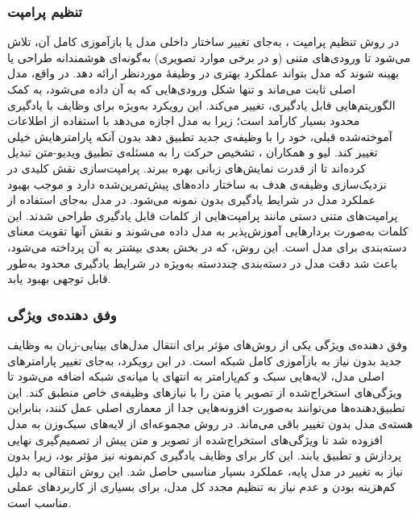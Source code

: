 \subsubsection{تنظیم پرامپت}
در روش تنظیم پرامپت
،
 به‌جای تغییر ساختار داخلی مدل یا بازآموزی کامل آن، تلاش می‌شود تا ورودی‌های متنی (و در برخی موارد تصویری) به‌گونه‌ای هوشمندانه طراحی یا بهینه شوند که مدل بتواند عملکرد بهتری در وظیفۀ موردنظر ارائه دهد. در واقع، مدل اصلی ثابت می‌ماند و تنها شکل ورودی‌هایی که به آن داده می‌شود، به کمک الگوریتم‌هایی قابل یادگیری، تغییر می‌کند. این رویکرد به‌ویژه برای وظایف با یادگیری محدود بسیار کارآمد است؛ زیرا به مدل اجازه می‌دهد با استفاده از اطلاعات آموخته‌شده قبلی، خود را با وظیفه‌ی جدید تطبیق دهد بدون آنکه پارامترهایش خیلی تغییر کند. لیو و همکاران 
\cite{actionclip}،
تشخیص حرکت را به مسئله‌ی تطبیق ویدیو-متن تبدیل کرده‌اند تا از قدرت نمایش‌های زبانی بهره ببرند. پرامپت‌سازی نقش کلیدی در نزدیک‌سازی وظیفه‌ی هدف به ساختار داده‌های پیش‌تمرین‌شده دارد و موجب بهبود عملکرد مدل در شرایط یادگیری بدون نمونه می‌شود. در مدل 
\cite{CoOp}
به‌جای استفاده از پرامپت‌های متنی دستی مانند
پرامپت‌هایی از کلمات قابل یادگیری طراحی شدند. این کلمات به‌صورت بردارهایی آموزش‌پذیر به مدل داده می‌شوند و نقش آنها تقویت معنای دسته‌بندی برای مدل است. این روش، که در بخش بعدی بیشتر به آن پرداخته می‌شود، باعث شد دقت مدل
در دسته‌بندی چند‌دسته به‌ویژه در شرایط یادگیری محدود به‌طور قابل توجهی بهبود یابد. 

\subsubsection{وفق دهنده‌ی ویژگی}
وفق دهنده‌ی ویژگی
یکی از روش‌های مؤثر برای انتقال مدل‌های بینایی-زبان به وظایف جدید بدون نیاز به بازآموزی کامل شبکه است. در این رویکرد، به‌جای تغییر پارامترهای اصلی مدل، لایه‌هایی سبک و کم‌پارامتر به انتهای یا میانه‌ی شبکه اضافه می‌شود تا ویژگی‌های استخراج‌شده از تصویر یا متن را با نیازهای وظیفه‌ی خاص منطبق کند. این تطبیق‌دهنده‌ها  می‌توانند به‌صورت افزونه‌هایی جدا از معماری اصلی عمل کنند، بنابراین هسته‌ی مدل بدون تغییر باقی می‌ماند. در روش 
\cite{CLIP-Adapter}
مجموعه‌ای از لایه‌های سبک‌وزن به مدل
افزوده شد تا ویژگی‌های استخراج‌شده از تصویر و متن پیش از تصمیم‌گیری نهایی پردازش و تطبیق یابند. این کار برای وظایف یادگیری کم‌نمونه نیز مؤثر بود، زیرا بدون نیاز به تغییر در مدل پایه، عملکرد بسیار مناسبی حاصل شد. این روش انتقالی به دلیل کم‌هزینه بودن و عدم نیاز به تنظیم مجدد کل مدل، برای بسیاری از کاربردهای عملی مناسب است.

